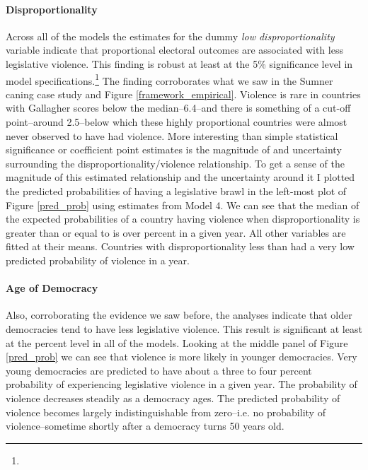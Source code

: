 \documentclass[a4paper]{article}\usepackage[]{graphicx}\usepackage[]{color}
\begin{document}
\paragraph{Disproportionality}

Across all of the models the estimates for the dummy {\emph{low disproportionality}} variable indicate that proportional electoral outcomes are associated with less legislative violence. This finding is robust at least at the 5\% significance level in  model specifications.\footnote{} The finding corroborates what we saw in the Sumner caning case study and Figure \ref{framework_empirical}. Violence is rare in countries with Gallagher scores below the median--6.4--and there is something of a cut-off point--around 2.5--below which these highly proportional countries were almost never observed to have had violence. More interesting than simple statistical significance or coefficient point estimates is the magnitude of and uncertainty surrounding the disproportionality/violence relationship. To get a sense of the magnitude of this estimated relationship and the uncertainty around it I plotted the predicted probabilities of having a legislative brawl in the left-most plot of Figure \ref{pred_prob} using estimates from Model 4. We can see that the median of the expected probabilities of a country having violence when disproportionality is greater than or equal to  is  over  percent in a given year. All other variables are fitted at their means. Countries with disproportionality less than  had a very low predicted probability of violence in a year.

\paragraph{Age of Democracy}

Also, corroborating the evidence we saw before, the analyses indicate that older democracies tend to have less legislative violence. This result is significant at least at the  percent level in all of the models. Looking at the middle panel of Figure \ref{pred_prob} we can see that violence is more likely in younger democracies. Very young democracies are predicted to have about a three to four percent probability of experiencing legislative violence in a given year. The probability of violence decreases steadily as a democracy ages. The predicted probability of violence becomes largely indistinguishable from zero--i.e. no probability of violence--sometime shortly after a democracy turns 50 years old.
\end{document}
